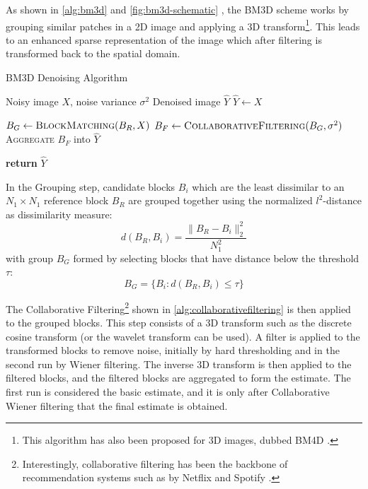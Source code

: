 As shown in \cref{alg:bm3d} and \cref{fig:bm3d-schematic}
, the \gls{BM3D} scheme works by grouping similar patches in a 2D image and applying a 3D transform\footnote{This algorithm has also been proposed for 3D images, dubbed BM4D \cite{mNonlocalTransformdomainFilter}.}. This leads to an enhanced sparse representation of the image which after filtering is transformed back to the spatial domain.
\begin{algorithm}
    \caption{BM3D Denoising Algorithm}\label{alg:bm3d}
    \begin{algorithmic}[1]
    \Require Noisy image $X$, noise variance $\sigma^2$
    \Ensure Denoised image $\hat{Y}$
    \Statex
        \State $\hat{Y} \gets X$
        
            \State $B_{G} \gets \textsc{BlockMatching}(B_R, X)$
            \State $B_{F} \gets \textsc{CollaborativeFiltering}(B_{G}, \sigma^2)$
            \State \textsc{Aggregate} $B_{F}$ into $\hat{Y}$
        \EndFor
        
        \State \textbf{return} $\hat{Y}$
    \EndProcedure
    \end{algorithmic}
\end{algorithm}

In the Grouping step, candidate blocks $B_i$ which are the least dissimilar to an $N_1 \times N_1$ reference block $B_R$ are grouped together using the normalized $l^2$-distance as dissimilarity measure:
$$d(B_R, B_i) = \frac{\|B_R - B_i\|_2^2}{N_1^2}$$
with group $B_G$ formed by selecting blocks that have distance below the threshold $\tau$:
$$B_G = \{ B_i : d(B_R, B_i) \leq \tau \}$$

The Collaborative Filtering\footnote{Interestingly, collaborative filtering has been the backbone of recommendation systems such as by Netflix and Spotify \cite{bellLessonsNetflixPrize2007,drorYahooMusicDataset2012}.} shown in \cref{alg:collaborativefiltering} is then applied to the grouped blocks. This step consists of a 3D transform such as the discrete cosine transform (or the wavelet transform can be used).
A filter is applied to the transformed blocks to remove noise, initially by hard thresholding and in the second run by Wiener filtering. The inverse 3D transform is then applied to the filtered blocks, and the filtered blocks are aggregated to form the estimate. The first run is considered the basic estimate, and it is only after Collaborative Wiener filtering that the final estimate is obtained.
    
